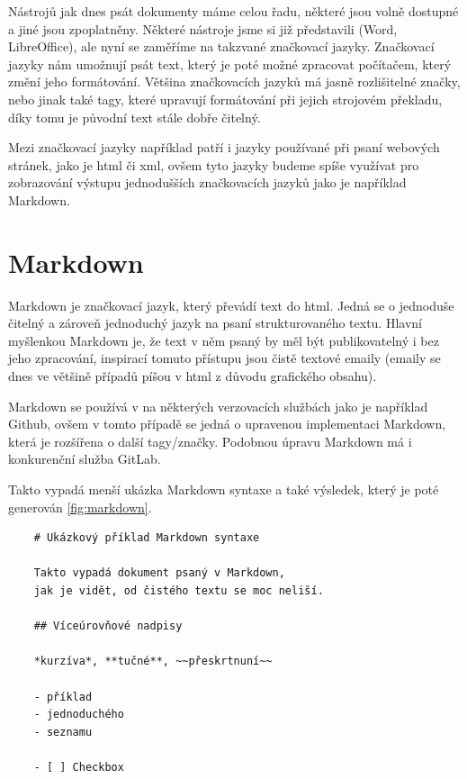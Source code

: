 Nástrojů jak dnes psát dokumenty máme celou řadu, některé jsou volně dostupné a jiné jsou zpoplatněny. Některé nástroje jsme si již představili (Word, LibreOffice), ale
nyní se zaměříme na takzvané značkovací jazyky. Značkovací jazyky nám umožnují psát text, který je poté možné zpracovat počítačem, který změní jeho formátování. Většina
značkovacích jazyků má jasně rozlišitelné značky, nebo jinak také tagy, které upravují formátování při jejich strojovém překladu, díky tomu je původní text stále dobře čitelný.
\cite{markup}

Mezi značkovací jazyky například patří i jazyky používané při psaní webových stránek, jako je \gls{html} či \gls{xml}, ovšem tyto jazyky budeme spíše využívat pro zobrazování výstupu
jednodušších značkovacích jazyků jako je například Markdown.

\section{Markdown}

Markdown je značkovací jazyk, který převádí text do \gls{html}. Jedná se o jednoduše čitelný a zároveň jednoduchý jazyk na psaní strukturovaného textu. Hlavní myšlenkou Markdown je, že
text v něm psaný by měl být publikovatelný i bez jeho zpracování, inspirací tomuto přístupu jsou čistě textové emaily (emaily se dnes ve většině případů píšou v \gls{html}
z důvodu grafického obsahu). \cite{markdown}

Markdown se používá v na některých verzovacích službách jako je například Github, ovšem v tomto případě se jedná o upravenou implementaci Markdown, která je rozšířena o další
tagy/značky. Podobnou úpravu Markdown má i konkurenční služba GitLab.

Takto vypadá menší ukázka Markdown syntaxe a také výsledek, který je poté generován \ref{fig:markdown}.

\clearpage

\begin{verbatim}
    # Ukázkový příklad Markdown syntaxe

    Takto vypadá dokument psaný v Markdown,
    jak je vidět, od čistého textu se moc neliší.

    ## Víceúrovňové nadpisy

    *kurzíva*, **tučné**, ~~přeskrtnuní~~

    - příklad
    - jednoduchého
    - seznamu

    - [ ] Checkbox
\end{verbatim}

